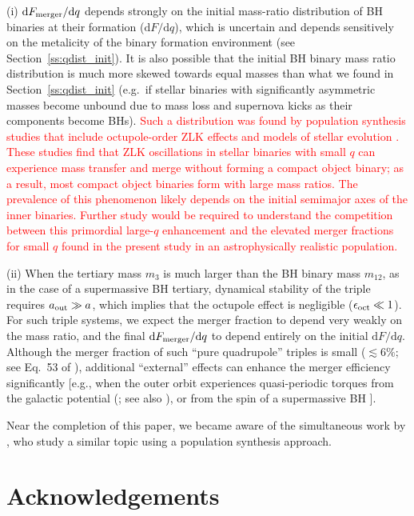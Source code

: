 \documentclass[
        fleqn,
        usenatbib,
    ]{mnras}
\newcommand*{\md}[0]{\mathrm{d}}
\begin{document}
(i) $\md F_{\rm merger}/\md q$ depends strongly on the initial mass-ratio
distribution of BH binaries at their formation ($\md F/\md q$), which is
uncertain and depends sensitively on the metalicity of the binary formation
environment (see Section~\ref{ss:qdist_init}). It is also possible that the
initial BH binary mass ratio distribution is much more skewed towards equal
masses than what we found in Section~\ref{ss:qdist_init} (e.g.\ if stellar
binaries with significantly asymmetric masses become unbound due to mass loss
and supernova kicks as their components become BHs). \textcolor{red}{Such a
distribution was found by population synthesis studies that include
octupole-order ZLK effects and models of stellar evolution
\citep[e.g.][]{Hamers_q, toonen2018rate}. These studies find that ZLK
oscillations in stellar binaries with small $q$ can experience mass transfer and
merge without forming a compact object binary; as a result, most compact object
binaries form with large mass ratios. The prevalence of this phenomenon likely
depends on the initial semimajor axes of the inner binaries. Further study would
be required to understand the competition between this primordial large-$q$
enhancement and the elevated merger fractions for small $q$ found in the present
study in an astrophysically realistic population.}

(ii) When the tertiary mass $m_3$ is much larger than the BH binary mass
$m_{12}$, as in the case of a supermassive BH tertiary, dynamical stability of
the triple requires $a_{\rm out} \gg a$, which implies that the octupole effect
is negligible ($\epsilon_{\rm oct}\ll 1$). For such triple systems, we expect
the merger fraction to depend very weakly on the mass ratio, and the final $\md
F_{\rm merger}/\md q$ to depend entirely on the initial $\md F/\md q$. Although
the merger fraction of such ``pure quadrupole'' triples is small ($\lesssim
6\%$; see Eq.~53 of \citealp{LL18}), additional ``external'' effects can enhance
the merger efficiency significantly [e.g., when the outer orbit experiences
quasi-periodic torques from the galactic potential
(\citealp{petrovich2017greatly}; see also \citealp{hamers2017secular}), or from
the spin of a supermassive BH \citep{LLW_apjl}].

Near the completion of this paper, we became aware of the simultaneous work by
\citet{martinez2021mass}, who study a similar topic using a population synthesis
approach.

\section{Acknowledgements}\label{s:ack}
\end{document}
